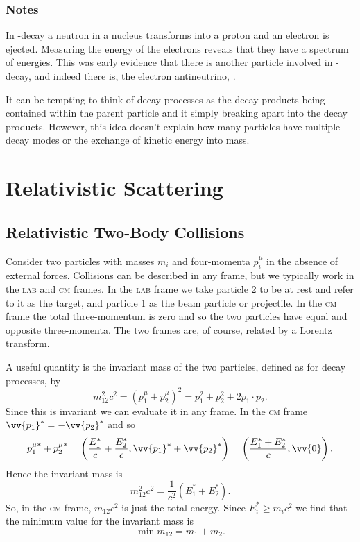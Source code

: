 \documentclass[fleqn]{NotesClass}
\newcommand{\LAB}{\textsc{lab}}
\newcommand{\CM}{\textsc{cm}}
\begin{document}
    \subsection{Notes}
    In \Pbetaneutral-decay a neutron in a nucleus transforms into a proton and an electron is ejected.
    Measuring the energy of the electrons reveals that they have a spectrum of energies.
    This was early evidence that there is another particle involved in \Pbetaneutral-decay, and indeed there is, the electron antineutrino, \APneutrinoelectron.
    
    It can be tempting to think of decay processes as the decay products being contained within the parent particle and it simply breaking apart into the decay products.
    However, this idea doesn't explain how many particles have multiple decay modes or the exchange of kinetic energy into mass.
    
    \chapter{Relativistic Scattering}
    \section{Relativistic Two-Body Collisions}
    Consider two particles with masses \(m_i\) and four-momenta \(p_i^\mu\) in the absence of external forces.
    Collisions can be described in any frame, but we typically work in the \LAB{} and \CM{} frames.
    In the \LAB{} frame we take particle 2 to be at rest and refer to it as the target, and particle 1 as the beam particle or projectile.
    In the \CM{} frame the total three-momentum is zero and so the two particles have equal and opposite three-momenta.
    The two frames are, of course, related by a Lorentz transform.
    
    A useful quantity is the invariant mass of the two particles, defined as for decay processes, by
    \begin{equation}
        m_{12}^2c^2 = (p_1^\mu + p_2^\mu)^2 = p_1^2 + p_2^2 + 2p_1\cdot p_2.
    \end{equation}
    Since this is invariant we can evaluate it in any frame.
    In the \CM{} frame \(\vv{p_1}^* = -\vv{p_2}^*\) and so
    \begin{equation}
        {p_1^\mu}^* + {p_2^\mu}^* = \left( \frac{E_1^*}{c} + \frac{E_2^*}{c}, \vv{p_1}^* + \vv{p_2}^* \right) = \left( \frac{E_1^* + E_2^*}{c}, \vv{0} \right).
    \end{equation}
    Hence the invariant mass is
    \begin{equation}
        m_{12}^2c^2 = \frac{1}{c^2}(E_1^* + E_2^*).
    \end{equation}
    So, in the \CM{} frame, \(m_{12}c^2\) is just the total energy.
    Since \(E_i^* \ge m_ic^2\) we find that the minimum value for the invariant mass is
    \begin{equation}
        \min m_{12} = m_1 + m_2.
    \end{equation}
    
\end{document}
